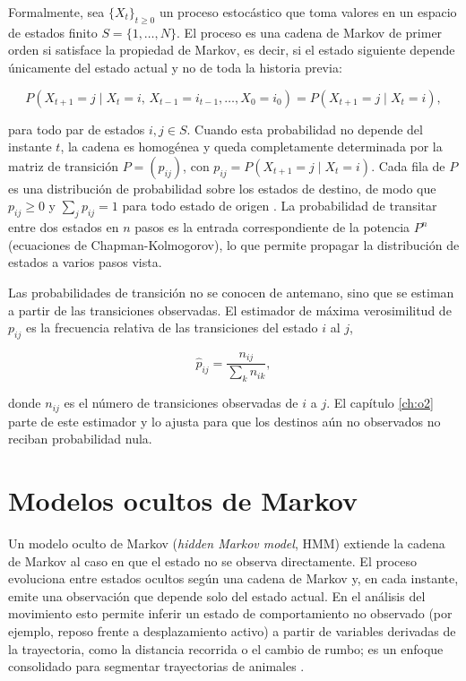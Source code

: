 Formalmente, sea $\{X_t\}_{t \geq 0}$ un proceso estocástico que toma valores en un
espacio de estados finito $S = \{1, \dots, N\}$. El proceso es una cadena de Markov
de primer orden si satisface la propiedad de Markov, es decir, si el estado
siguiente depende únicamente del estado actual y no de toda la historia previa:

\begin{equation}
  P(X_{t+1} = j \mid X_t = i,\, X_{t-1} = i_{t-1}, \dots, X_0 = i_0)
  = P(X_{t+1} = j \mid X_t = i),
  \label{eq:prelim-markov}
\end{equation}

para todo par de estados $i, j \in S$. Cuando esta probabilidad no depende del
instante $t$, la cadena es homogénea y queda completamente determinada por la
matriz de transición $P = (p_{ij})$, con $p_{ij} = P(X_{t+1} = j \mid X_t = i)$.
Cada fila de $P$ es una distribución de probabilidad sobre los estados de destino,
de modo que $p_{ij} \geq 0$ y $\sum_{j} p_{ij} = 1$ para todo estado de origen
\cite{norris1997}. La probabilidad de transitar entre dos estados en $n$ pasos es
la entrada correspondiente de la potencia $P^{n}$ (ecuaciones de
Chapman-Kolmogorov), lo que permite propagar la distribución de estados a varios
pasos vista.

Las probabilidades de transición no se conocen de antemano, sino que se estiman a
partir de las transiciones observadas. El estimador de máxima verosimilitud de
$p_{ij}$ es la frecuencia relativa de las transiciones del estado $i$ al $j$,

\begin{equation}
  \hat{p}_{ij} = \frac{n_{ij}}{\sum_{k} n_{ik}},
  \label{eq:prelim-mle}
\end{equation}

donde $n_{ij}$ es el número de transiciones observadas de $i$ a $j$. El capítulo
\ref{ch:o2} parte de este estimador y lo ajusta para que los destinos aún no
observados no reciban probabilidad nula.

\section{Modelos ocultos de Markov}
\label{sec:prelim-hmm}

Un modelo oculto de Markov (\textit{hidden Markov model}, HMM) extiende la cadena de
Markov al caso en que el estado no se observa directamente. El proceso evoluciona
entre estados ocultos según una cadena de Markov y, en cada instante, emite una
observación que depende solo del estado actual. En el análisis del movimiento esto
permite inferir un estado de comportamiento no observado (por ejemplo, reposo frente
a desplazamiento activo) a partir de variables derivadas de la trayectoria, como la
distancia recorrida o el cambio de rumbo; es un enfoque consolidado para segmentar
trayectorias de animales \cite{langrock2012}.

